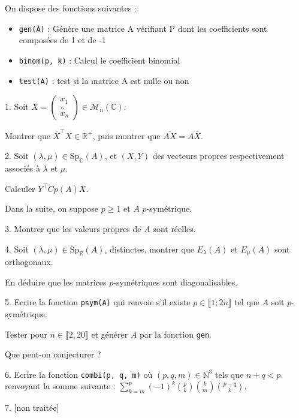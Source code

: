 \noindent On dispose des fonctions suivantes :
\begin{itemize}
  \item \lstinline {gen(A)} : Génère une matrice A vérifiant P dont les coefficients sont composées de 1 et de -1 \\
  \item \lstinline {binom(p, k)} : Calcul le coefficient binomial \\
  \item \lstinline {test(A)} : test si la matrice A est nulle ou non \\
\end{itemize}

\vspace{5pt}
1. Soit $X  = 
\begin{pmatrix}
  x_1 \\ .. \\ x_n 
\end{pmatrix} \in \mathcal{M}_n(\mathbb{C})$.

Montrer que $\overline{X}^\top X \in \mathbb{R}^+$, puis montrer que $\overline{AX} = A\overline{X}$.

\vspace{5pt}
2. Soit $(\lambda, \mu) \in \mathrm{Sp}_\mathbb{C}(A)$, et $(X,Y)$ des vecteurs propres respectivement associés à $\lambda$ et $\mu$.

Calculer $Y^\top Cp(A)X$.

\vspace{5pt}
\noindent Dans la suite, on suppose $p \geqslant 1$ et $A$ $p$-symétrique.

\vspace{5pt}
3. Montrer que les valeurs propres de $A$ sont réelles.

\vspace{5pt}
4. Soit $(\lambda, \mu) \in \mathrm{Sp}_\mathbb{R}(A)$, distinctes, montrer que $E_\lambda(A)$ et $E_\mu(A)$ sont orthogonaux.

En déduire que les matrices $p$-symétriques sont diagonalisables.

\vspace{5pt}
5. Ecrire la fonction \lstinline {psym(A)} qui renvoie s'il existe $p \in \llbracket 1; 2n \rrbracket$ tel que $A$ soit $p$-symétrique.

Tester pour $n \in \llbracket 2, 20 \rrbracket$ et générer $A$ par la fonction \lstinline {gen}.

Que peut-on conjecturer ?

\vspace{5pt}
6. Ecrire la fonction \lstinline {combi(p, q, m)} où $(p, q, m) \in \mathbb{N}^3$ tels que $n+q < p$ renvoyant la somme suivante :
$\displaystyle \sum_{k=m}^{p} (-1)^k \binom {p} {k} \binom {k} {m} \binom {p-q} {k}$.

\vspace{5pt}
7. [non traitée]
